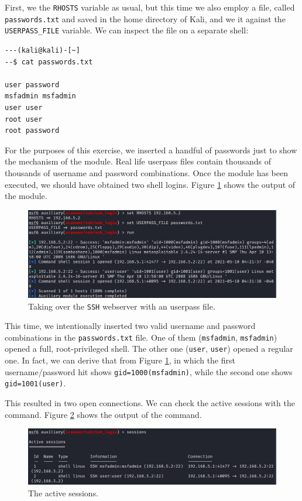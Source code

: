 First, we  the \texttt{RHOSTS} variable as usual, but this time we also employ a file, called \texttt{passwords.txt} and saved in the home directory of Kali, and we  it against the \texttt{USERPASS\_FILE} variable. We can inspect the file on a separate shell:

\begin{lstlisting}
---(kali@kali)-[~]
--$ cat passwords.txt 

user password
msfadmin msfadmin
user user
root user
root password
\end{lstlisting}

For the purposes of this exercise, we inserted a handful of passwords just to show the mechanism of the module. Real life userpass files contain thousands of thousands of username and password combinations. Once the module has been executed, we should have obtained two shell logins. Figure \ref{fig:ex1:brutessh} shows the output of the module.

\begin{figure}[htbp]
	\centering
	\includegraphics[width=\textwidth]{../drawable/exercise_1_screenshots/es1-brutessh.jpg}
	\caption{Taking over the \texttt{SSH} webserver with an userpass file.}
	\label{fig:ex1:brutessh}
\end{figure}

This time, we intentionally inserted two valid username and password combinations in the \texttt{passwords.txt} file. One of them (\texttt{msfadmin}, \texttt{msfadmin}) opened a full, root-privileged shell. The other one (\texttt{user}, \texttt{user}) opened a regular one. In fact, we can derive that from Figure \ref{fig:ex1:brutessh}, in which the first username/password hit shows \texttt{gid=1000(msfadmin)}, while the second one shows \texttt{gid=1001(user)}.

This resulted in two open connections. We can check the active sessions with the  command. Figure \ref{fig:ex1:sshsessions} shows the output of the command.

\begin{figure}[htbp]
	\centering
	\includegraphics[width=\textwidth]{../drawable/exercise_1_screenshots/es1-sshsessions.jpg}
	\caption{The active sessions.}
	\label{fig:ex1:sshsessions}
\end{figure}

